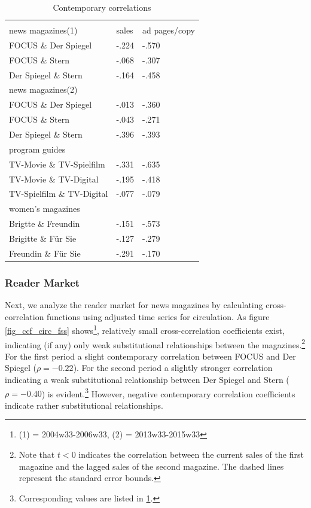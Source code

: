 \documentclass[12pt,a4paper,notitlepage]{article}
\begin{document}
\begin{table}[!htbp] \centering
	\caption{Contemporary correlations}
	\label{tab_CCF}
\begin{tabular}{@{\extracolsep{5pt}} lll}
\\[-1.8ex]\hline 
\hline \\[-1.8ex]
	news magazines(1) & sales & ad pages/copy \\
	\hline
	FOCUS \& Der Spiegel & -.224 & -.570 \\
	FOCUS \& Stern & -.068 & -.307 \\
	Der Spiegel \& Stern & -.164 & -.458 \\
	\hline
	news magazines(2) & & \\
	\hline
	FOCUS \& Der Spiegel & -.013 & -.360 \\
	FOCUS \& Stern & -.043 & -.271 \\
	Der Spiegel \& Stern & -.396 & -.393 \\
	\hline
	program guides & & \  \\ 
	\hline
	TV-Movie \& TV-Spielfilm & -.331 & -.635 \\
	TV-Movie \& TV-Digital & -.195 & -.418 \\
	TV-Spielfilm \& TV-Digital & -.077 & -.079 \\ 
	\hline
	women's magazines &  & \  \\ 
	\hline
	Brigtte \& Freundin & -.151 & -.573 \\ 
	Brigitte \& Für Sie & -.127 & -.279 \\ 
	Freundin \& Für Sie & -.291 & -.170 \\ \hline
\end{tabular}
	\end{table}


\subsubsection{Reader Market}

Next, we analyze the reader market for news magazines by calculating cross-correlation functions using adjusted time series for circulation. As figure \ref{fig_ccf_circ_fss} shows\footnote{(1) = 2004w33-2006w33, (2) = 2013w33-2015w33}, relatively small cross-correlation coefficients exist, indicating (if any) only weak substitutional relationships between the magazines.\footnote{Note that $t<0$ indicates the correlation between the current sales of the first magazine and the lagged sales of the second magazine. The dashed lines represent the standard error bounds.} For the first period a slight contemporary correlation between FOCUS and Der Spiegel ($\rho=-0.22$). For the second period a slightly stronger correlation indicating a weak substitutional relationship between Der Spiegel and Stern ($\rho=-0.40$) is evident.\footnote{Corresponding values are listed in \ref{tab_CCF}.}  However, negative contemporary correlation coefficients indicate rather substitutional relationships.
\end{document}
